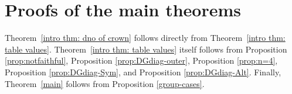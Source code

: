 \documentclass[11pt]{amsart}
\begin{document}
\section{Proofs of the main theorems}

Theorem~\ref{intro thm: dno of crown} follows directly from Theorem~\ref{intro thm: table values}. Theorem~\ref{intro thm: table values} itself follows from 
Proposition \ref{prop:notfaithful}, 
Proposition \ref{prop:DGdiag-outer}, 
Proposition \ref{prop:n=4}, 
Proposition \ref{prop:DGdiag-Sym}, and 
Proposition \ref{prop:DGdiag-Alt}. 
Finally, Theorem~\ref{main} follows  from 
Proposition \ref{group-cases}.









 \printbibliography[heading=bibintoc,title={Bibliography}]
\end{document}
